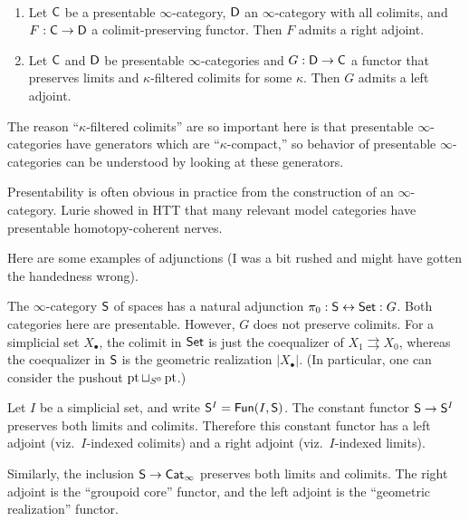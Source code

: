 \documentclass{amsart}
\begin{document}
\begin{thm}
	\,
	\begin{enumerate}
		\item Let $\mathsf{C}$ be a presentable $\infty$-category, $\mathsf{D}$ an $\infty$-category with all colimits, and $F: \mathsf{C} \to \mathsf{D}$ a colimit-preserving functor.
			Then $F$ admits a right adjoint.
		\item Let $\mathsf{C}$ and $\mathsf{D}$ be presentable $\infty$-categories and $G: \mathsf{D} \to \mathsf{C}$ a functor that preserves limits and $\kappa$-filtered colimits for some $\kappa$.
			Then $G$ admits a left adjoint.
	\end{enumerate}
\end{thm}

The reason ``$\kappa$-filtered colimits'' are so important here is that presentable $\infty$-categories have generators which are ``$\kappa$-compact,'' so behavior of presentable $\infty$-categories can be understood by looking at these generators.

Presentability is often obvious in practice from the construction of an $\infty$-category.
Lurie showed in HTT that many relevant model categories have presentable homotopy-coherent nerves.

Here are some examples of adjunctions (I was a bit rushed and might have gotten the handedness wrong).

\begin{ex}
	The $\infty$-category $\mathsf{S}$ of spaces has a natural adjunction $\pi_0: \mathsf{S} \leftrightarrow \mathsf{Set} :G$.
	Both categories here are presentable.
	However, $G$ does not preserve colimits.
	For a simplicial set $X_\bullet$, the colimit in $\mathsf{Set}$ is just the coequalizer of $X_1 \rightrightarrows X_0$, whereas the coequalizer in $\mathsf{S}$ is the geometric realization $|X_\bullet|$.
	(In particular, one can consider the pushout $\operatorname{pt} \sqcup_{S^0} \operatorname{pt}$.)
\end{ex}

\begin{ex}
	Let $I$ be a simplicial set, and write $\mathsf{S}^I = \mathsf{Fun}(I, \mathsf{S})$.
	The constant functor $\mathsf{S} \to \mathsf{S}^I$ preserves both limits and colimits.
	Therefore this constant functor has a left adjoint (viz.\ $I$-indexed colimits) and a right adjoint (viz.\ $I$-indexed limits).
\end{ex}

\begin{ex}
	Similarly, the inclusion $\mathsf{S} \to \mathsf{Cat}_\infty$ preserves both limits and colimits.
	The right adjoint is the ``groupoid core'' functor, and the left adjoint is the ``geometric realization'' functor.
\end{ex}
\end{document}
